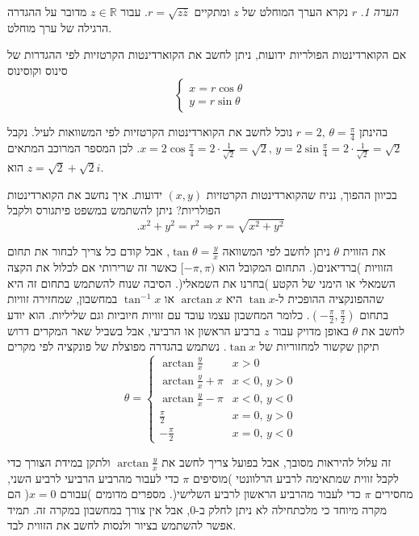 \documentclass[
  hebrew,
  12pt,
  a4paper,
  oneside]{book}
\theoremstyle{definition}
\theoremstyle{remark}
\theoremstyle{plain}
\theoremstyle{remark}
\newtheorem*{remark}{הערה}
\begin{document}
\begin{remark}
\(r\) נקרא הערך המוחלט של \(z\) ומתקיים \(r=\sqrt{z\overline{z}}\). עבור
\(z\in\mathbb{R}\) מדובר על ההגדרה הרגילה של ערך מוחלט.
\end{remark}

אם הקוארדינטות הפולריות ידועות, ניתן לחשב את הקוארדינטות הקרטזיות לפי
ההגדרות של סינוס וקוסינוס \[\begin{cases}
x=r\cos\theta\\
y=r\sin\theta
\end{cases}\]

\begin{example}

בהינתן \(r=2,\,\theta=\frac{\pi}{4}\) נוכל לחשב את הקוארדינטות הקרטזיות
לפי המשוואות לעיל. נקבל
\(x=2\cos\frac{\pi}{4}=2\cdot\frac{1}{\sqrt{2}}=\sqrt{2},\,y=2\sin\frac{\pi}{4}=2\cdot\frac{1}{\sqrt{2}}=\sqrt{2}\).
לכן המספר המרוכב המתאים הוא \(z=\sqrt{2}+\sqrt{2}i\).

\end{example}

בכיוון ההפוך, נניח שהקוארדינטות הקרטזיות \((x,y)\) ידועות. איך נחשב את
הקוארדינטות הפולריות? ניתן להשתמש במשפט פיתגורס ולקבל
\[.x^{2}+y^{2}=r^{2}\Rightarrow r=\sqrt{x^{2}+y^{2}}\]

את הזווית \(\theta\) ניתן לחשב לפי המשוואה \(\tan\theta=\frac{y}{x}\),
אבל קודם כל צריך לבחור את תחום הזוויות )ברדיאנים(. התחום המקובל הוא
\([-\pi,\pi)\) כאשר זה שרירותי אם לכלול את הקצה השמאלי או הימני של הקטע
)בחרנו את השמאלי(. הסיבה שנוח להשתמש בתחום זה היא שההפונקציה ההופכית
ל-\(\tan x\) היא \(\arctan x\) או \(\tan^{-1}x\) במחשבון, שמחזירה זוויות
בתחום \((-\frac{\pi}{2},\frac{\pi}{2})\). כלומר המחשבון עצמו עובד עם
זוויות חיוביות וגם שליליות. הוא יודע לחשב את \(\theta\) באופן מדויק עבור
\(z\) ברביע הראשון או הרביעי, אבל בשביל שאר המקרים דרוש תיקון שקשור
למחזוריות של \(\tan x\). נשתמש בהגדרה מפוצלת של פונקציה לפי מקרים
\[\theta=\begin{cases}
\arctan\frac{y}{x} & x>0\\
\arctan\frac{y}{x}+\pi & x<0,\,y>0\\
\arctan\frac{y}{x}-\pi & x<0,\,y<0\\
\frac{\pi}{2} & x=0,\,y>0\\
-\frac{\pi}{2} & x=0,\,y<0
\end{cases}\]

זה עלול להיראות מסובך, אבל בפועל צריך לחשב את \(\arctan\frac{y}{x}\)
ולתקן במידת הצורך כדי לקבל זווית שמתאימה לרביע הרלוונטי )מוסיפים \(\pi\)
כדי לעבור מהרביע הרביעי לרביע השני, מחסירים \(\pi\) כדי לעבור מהרביע
הראשון לרביע השלישי(. מספרים מדומים )עבורם \(x=0\)( הם מקרה מיוחד כי
מלכתחילה לא ניתן לחלק ב-\(0\), אבל אין צורך במחשבון במקרה זה. תמיד אפשר
להשתמש בציור ולנסות לחשב את הזווית לבד.
\end{document}
